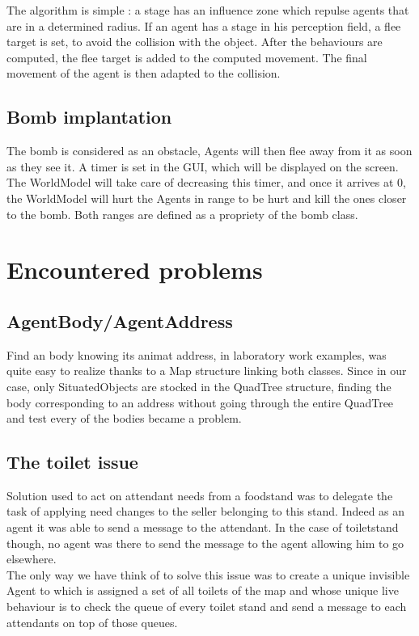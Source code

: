 The algorithm is simple : a stage has an influence zone which repulse agents
that are in a determined radius. If an agent has a stage in his perception
field, a flee target is set, to avoid the collision with the object. After the
behaviours are computed, the flee target is added to the computed movement. The
final movement of the agent is then adapted to the collision.

\subsection{Bomb implantation}

The bomb is considered as an obstacle, Agents will then flee away from it as soon as they see it. A timer is set in the GUI, which will be displayed on the screen. The WorldModel will take care of decreasing this timer, and once it arrives at 0, the WorldModel will hurt the Agents in range to be hurt and kill the ones closer to the bomb. Both ranges are defined as a propriety of the bomb class.

\section{Encountered problems}

\subsection{AgentBody/AgentAddress}

Find an body knowing its animat address, in laboratory work examples, was quite
easy to realize thanks to a Map structure linking both classes. Since in our
case, only SituatedObjects are stocked in the QuadTree structure, finding the
body corresponding to an address without going through the entire QuadTree and
test every of the bodies became a problem.

\subsection{The toilet issue}

Solution used to act on attendant needs from a foodstand was to delegate the task of applying need changes to the seller belonging to this stand. Indeed as an agent it was able to send a message to the attendant. In the case of toiletstand though, no agent was there to send the message to the agent allowing him to go elsewhere.\\

The only way we have think of to solve this issue was to create a unique invisible Agent to which is assigned a set of all toilets of the map and whose unique live behaviour is to check the queue of every toilet stand and send a message to each attendants on top of those queues.

